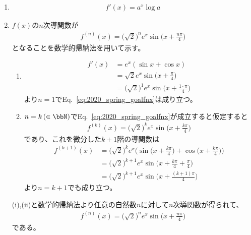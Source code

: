 \begin{ans*}
  ${}$
  \begin{enumerate}[label=(\alph*)]
    \item
    \begin{gather}
      f'(x) = a^x \log a
    \end{gather}
    \item
    $f(x)$の$n$次導関数が
    \begin{gather}
      f^{(n)}(x) = \bigl(\sqrt{2}\bigr)^n e^x\sin\biggl(x + \frac{n\pi}{4}\biggr) \label{eq:2020_spring_goalfnx}
    \end{gather}
    となることを数学的帰納法を用いて示す。
    \begin{enumerate}[label=(\roman*)]
      \item
      \begin{align}
        f'(x)
        &= e^x(\sin x + \cos x) \\
        &= \sqrt{2}e^x \sin\biggl(x + \frac{\pi}{4}\biggr) \\
        &= \bigl(\sqrt{2}\bigr)^{1}e^x \sin\biggl(x + \frac{1\cdot\pi}{4}\biggr)
      \end{align}
      より$n=1$でEq.~\eqref{eq:2020_spring_goalfnx}は成り立つ。
      \item $n=k \,(\in \bbN)$でEq.~\eqref{eq:2020_spring_goalfnx}が成立すると仮定すると
      \begin{align}
        f^{(k)}(x) = \bigl(\sqrt{2}\bigr)^k e^x\sin\biggl(x + \frac{k\pi}{4}\biggr)
      \end{align}
      であり、これを微分した$k+1$階の導関数は
      \begin{align}
        f^{(k+1)}(x)
        &= \bigl(\sqrt{2}\bigr)^k e^x\biggl(\sin\biggl(x + \frac{k\pi}{4}\biggr) + \cos\biggl(x + \frac{k\pi}{4}\biggr)\biggr) \\
        &= \bigl(\sqrt{2}\bigr)^{k+1} e^x\sin\biggl(x + \frac{k\pi}{4}+\frac{\pi}{4}\biggr) \\
        &= \bigl(\sqrt{2}\bigr)^{k+1} e^x\sin\biggl(x + \frac{(k+1)\pi}{4}\biggr)
      \end{align}
      より$n=k+1$でも成り立つ。
    \end{enumerate}
    (i),(ii)と数学的帰納法より任意の自然数$n$に対して$n$次導関数が得られて、
    \begin{gather}
      f^{(n)}(x) = \bigl(\sqrt{2}\bigr)^n e^x\sin\biggl(x + \frac{n\pi}{4}\biggr)
    \end{gather}
    である。
  \end{enumerate}

\end{ans*}
